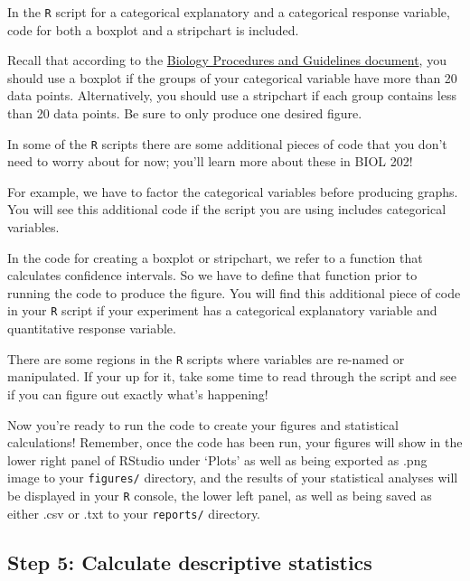 \documentclass[
]{book}
\begin{document}
In the \texttt{R} script for a categorical explanatory and a categorical response variable, code for both a boxplot and a stripchart is included.

Recall that according to the \href{https://ubco-biology.github.io/Procedures-and-Guidelines/figures.html}{Biology Procedures and Guidelines document}, you should use a boxplot if the groups of your categorical variable have more than 20 data points. Alternatively, you should use a stripchart if each group contains less than 20 data points. Be sure to only produce one desired figure.

In some of the \texttt{R} scripts there are some additional pieces of code that you don't need to worry about for now; you'll learn more about these in BIOL 202!

For example, we have to factor the categorical variables before producing graphs. You will see this additional code if the script you are using includes categorical variables.

In the code for creating a boxplot or stripchart, we refer to a function that calculates confidence intervals. So we have to define that function prior to running the code to produce the figure. You will find this additional piece of code in your \texttt{R} script if your experiment has a categorical explanatory variable and quantitative response variable.

There are some regions in the \texttt{R} scripts where variables are re-named or manipulated. If your up for it, take some time to read through the script and see if you can figure out exactly what's happening!

Now you're ready to run the code to create your figures and statistical calculations! Remember, once the code has been run, your figures will show in the lower right panel of RStudio under `Plots' as well as being exported as .png image to your \texttt{figures/} directory, and the results of your statistical analyses will be displayed in your \texttt{R} console, the lower left panel, as well as being saved as either .csv or .txt to your \texttt{reports/} directory.

\hypertarget{step-5-calculate-descriptive-statistics}{%
\subsection*{Step 5: Calculate descriptive statistics}\label{step-5-calculate-descriptive-statistics}}
\end{document}
